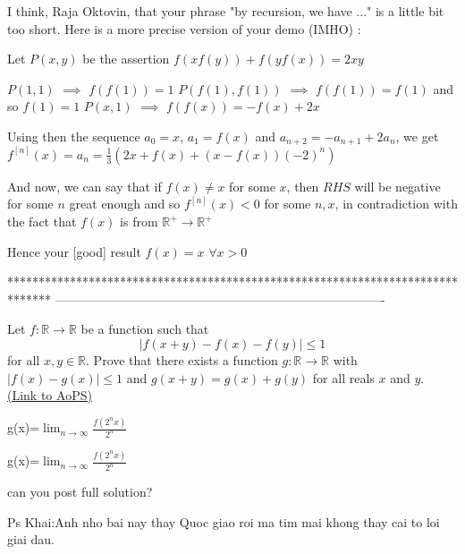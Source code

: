 \begin{solution}
	I think, Raja Oktovin, that your phrase "by recursion, we have ..." is a little bit too short. Here is a more precise version of your demo (IMHO) :

Let $ P(x,y)$ be the assertion $ f(xf(y)) + f(yf(x)) = 2xy$

$ P(1,1)$ $ \implies$ $ f(f(1)) = 1$
$ P(f(1),f(1))$ $ \implies$ $ f(f(1)) = f(1)$ and so $ f(1) = 1$
$ P(x,1)$ $ \implies$ $ f(f(x)) = - f(x) + 2x$

Using then the sequence $ a_0 = x$, $ a_1 = f(x)$ and $ a_{n + 2} = - a_{n + 1} + 2a_n$, we get $ f^{[n]}(x) = a_n = \frac 13(2x + f(x) + (x - f(x))( - 2)^n)$

And now, we can say that if $ f(x)\ne x$ for some $ x$, then $ RHS$ will be negative for some $ n$ great enough and so $ f^{[n]}(x) < 0$ for some $ n,x$, in contradiction with the fact that $ f(x)$ is from $ \mathbb R^ + \to\mathbb R^ +$

Hence your [good] result $ \boxed{f(x) = x}$ $ \forall x>0$
\end{solution}
*******************************************************************************
-------------------------------------------------------------------------------

\begin{problem}
	Let $f: \mathbb R \to \mathbb R$ be a function such that \[|f(x + y) - f(x)- f(y)|\leq 1\] for all $ x,y \in \mathbb R$. Prove that there exists a function $g: \mathbb R \to \mathbb R$ with $ |f(x) - g(x)| \leq 1$ and $ g(x +y)= g(x)+g(y)$ for all reals $x$ and $y$.
	\flushright \href{https://artofproblemsolving.com/community/c6h312802}{(Link to AoPS)}
\end{problem}



\begin{solution}
	g(x)=$ \lim_{n\to\infty}{ \frac{f(2^nx)}{2^n}}$
\end{solution}



\begin{solution}
	\begin{tcolorbox}g(x)=$ \lim_{n\to\infty}{\frac {f(2^nx)}{2^n}}$\end{tcolorbox}
can you post full solution?

Ps Khai:Anh nho bai nay thay Quoc giao roi ma tim mai khong thay cai to loi giai dau.
\end{solution}



